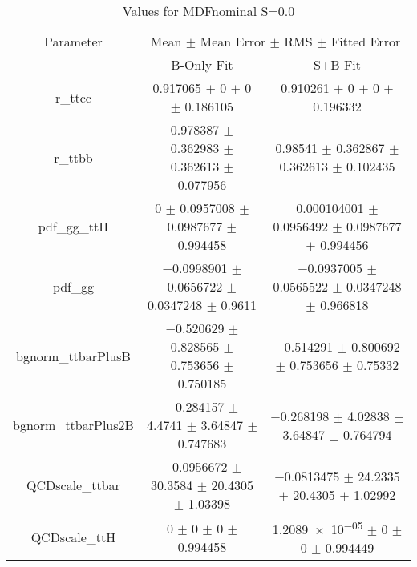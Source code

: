 \begin{table}
\centering
\caption{Values for MDFnominal S=0.0}
\begin{tabular}{ccc}
\toprule
Parameter & \multicolumn{2}{c}{Mean $\pm$ Mean Error $\pm$ RMS $\pm$ Fitted Error}\\
 & B-Only Fit & S+B Fit\\
\midrule
r\_ttcc & \num{0.917065} $\pm$ \num{0} $\pm$ \num{0} $\pm$ \num{0.186105} & \num{0.910261} $\pm$ \num{0} $\pm$ \num{0} $\pm$ \num{0.196332}\\
r\_ttbb & \num{0.978387} $\pm$ \num{0.362983} $\pm$ \num{0.362613} $\pm$ \num{0.077956} & \num{0.98541} $\pm$ \num{0.362867} $\pm$ \num{0.362613} $\pm$ \num{0.102435}\\
pdf\_gg\_ttH & \num{0} $\pm$ \num{0.0957008} $\pm$ \num{0.0987677} $\pm$ \num{0.994458} & \num{0.000104001} $\pm$ \num{0.0956492} $\pm$ \num{0.0987677} $\pm$ \num{0.994456}\\
pdf\_gg & \num{-0.0998901} $\pm$ \num{0.0656722} $\pm$ \num{0.0347248} $\pm$ \num{0.9611} & \num{-0.0937005} $\pm$ \num{0.0565522} $\pm$ \num{0.0347248} $\pm$ \num{0.966818}\\
bgnorm\_ttbarPlusB & \num{-0.520629} $\pm$ \num{0.828565} $\pm$ \num{0.753656} $\pm$ \num{0.750185} & \num{-0.514291} $\pm$ \num{0.800692} $\pm$ \num{0.753656} $\pm$ \num{0.75332}\\
bgnorm\_ttbarPlus2B & \num{-0.284157} $\pm$ \num{4.4741} $\pm$ \num{3.64847} $\pm$ \num{0.747683} & \num{-0.268198} $\pm$ \num{4.02838} $\pm$ \num{3.64847} $\pm$ \num{0.764794}\\
QCDscale\_ttbar & \num{-0.0956672} $\pm$ \num{30.3584} $\pm$ \num{20.4305} $\pm$ \num{1.03398} & \num{-0.0813475} $\pm$ \num{24.2335} $\pm$ \num{20.4305} $\pm$ \num{1.02992}\\
QCDscale\_ttH & \num{0} $\pm$ \num{0} $\pm$ \num{0} $\pm$ \num{0.994458} & \num{1.2089e-05} $\pm$ \num{0} $\pm$ \num{0} $\pm$ \num{0.994449}\\
\bottomrule
\end{tabular}
\end{table}
